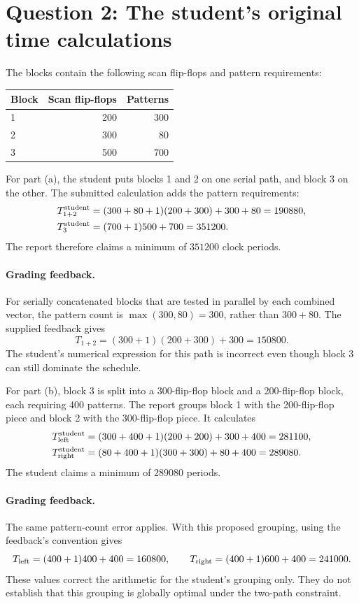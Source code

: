 \documentclass[11pt,a4paper]{article}
\begin{document}
\section{Question 2: The student's original time calculations}
The blocks contain the following scan flip-flops and pattern requirements:
\begin{center}\begin{tabular}{lrr}
\toprule Block&Scan flip-flops&Patterns\\\midrule
1&200&300\\2&300&80\\3&500&700\\\bottomrule
\end{tabular}\end{center}
For part (a), the student puts blocks 1 and 2 on one serial path, and block 3 on the other. The submitted calculation adds the pattern requirements:
\begin{align*}
T_{1+2}^{\rm student}&=(300+80+1)(200+300)+300+80=190880,\\
T_3^{\rm student}&=(700+1)500+700=351200.
\end{align*}
The report therefore claims a minimum of $351200$ clock periods.
\paragraph{Grading feedback.}
For serially concatenated blocks that are tested in parallel by each combined vector, the pattern count is $\max(300,80)=300$, rather than $300+80$. The supplied feedback gives
\[
T_{1+2}=(300+1)(200+300)+300=150800.
\]
The student's numerical expression for this path is incorrect even though block 3 can still dominate the schedule.

For part (b), block 3 is split into a 300-flip-flop block and a 200-flip-flop block, each requiring 400 patterns. The report groups block 1 with the 200-flip-flop piece and block 2 with the 300-flip-flop piece. It calculates
\begin{align*}
T_{\rm left}^{\rm student}&=(300+400+1)(200+200)+300+400=281100,\\
T_{\rm right}^{\rm student}&=(80+400+1)(300+300)+80+400=289080.
\end{align*}
The student claims a minimum of $289080$ periods.
\paragraph{Grading feedback.}
The same pattern-count error applies. With this proposed grouping, using the feedback's convention gives
\[
T_{\rm left}=(400+1)400+400=160800,\qquad
T_{\rm right}=(400+1)600+400=241000.
\]
These values correct the arithmetic for the student's grouping only. They do not establish that this grouping is globally optimal under the two-path constraint.
\end{document}

